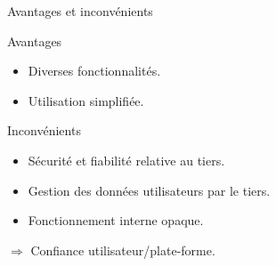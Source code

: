 \begin{frame}{Avantages et inconvénients}
    \begin{block}{Avantages}
        \begin{itemize}
            \item Diverses fonctionnalités.
            \item Utilisation simplifiée.
        \end{itemize}
    \end{block}
    \pause
    \begin{block}{Inconvénients}
        \begin{itemize}
            \item Sécurité et fiabilité relative au tiers.
            \item Gestion des données utilisateurs par le tiers.
            \item Fonctionnement interne opaque.
        \end{itemize}
        $\Rightarrow$ Confiance utilisateur/plate-forme.
    \end{block}
\end{frame}

